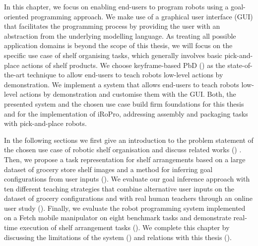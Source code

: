 In this chapter, we focus on enabling end-users to program robots using a goal-oriented programming approach. 
We make use of a graphical user interface (GUI) that facilitates the programming process by providing the user with an abstraction from the underlying modelling language.
As treating all possible application domains is beyond the scope of this thesis, we will focus on the specific use case of shelf organising tasks, which generally involves basic pick-and-place actions of shelf products.
We choose keyframe-based PbD (\cite{akgun12klfd}) as the state-of-the-art technique to allow end-users to teach robots low-level actions by demonstration.
We implement a system that allows end-users to teach robots low-level actions by demonstration and customise them with the GUI.
Both, the presented system and the chosen use case build firm foundations for this thesis and for the implementation of iRoPro, addressing assembly and packaging tasks with pick-and-place robots.

In the following sections we first give an introduction to the problem statement of the chosen use case of robotic shelf organisation and discuss related works () .
Then, we propose a task representation for shelf arrangements based on a large dataset of grocery store shelf images and a method for inferring goal configurations from user inputs ().
We evaluate our goal inference approach with ten different teaching strategies that combine alternative user inputs on the dataset of grocery configurations and with real human teachers through an online user study ().
Finally, we evaluate the robot programming system implemented on a Fetch mobile manipulator on eight benchmark tasks and demonstrate real-time execution of shelf arrangement tasks ().
We complete this chapter by discussing the limitations of the system () and relations with this thesis ().


